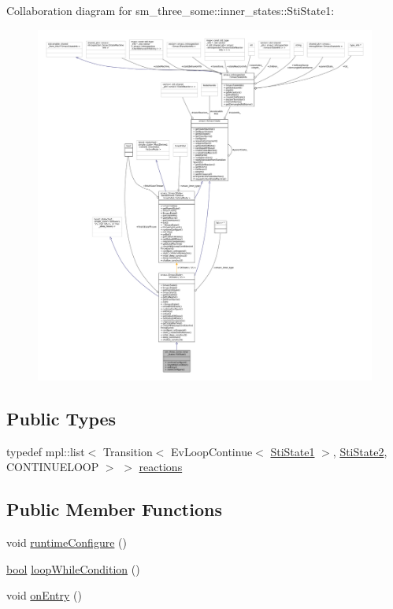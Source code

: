 Collaboration diagram for sm\+\_\+three\+\_\+some\+:\+:inner\+\_\+states\+:\+:Sti\+State1\+:
\nopagebreak
\begin{figure}[H]
\begin{center}
\leavevmode
\includegraphics[width=350pt]{structsm__three__some_1_1inner__states_1_1StiState1__coll__graph}
\end{center}
\end{figure}
\subsection*{Public Types}
\begin{DoxyCompactItemize}
\item 
typedef mpl\+::list$<$ Transition$<$ Ev\+Loop\+Continue$<$ \hyperlink{structsm__three__some_1_1inner__states_1_1StiState1}{Sti\+State1} $>$, \hyperlink{structsm__three__some_1_1inner__states_1_1StiState2}{Sti\+State2}, C\+O\+N\+T\+I\+N\+U\+E\+L\+O\+OP $>$ $>$ \hyperlink{structsm__three__some_1_1inner__states_1_1StiState1_a3880ea2992d3e5153deec7adafc52d8e}{reactions}
\end{DoxyCompactItemize}
\subsection*{Public Member Functions}
\begin{DoxyCompactItemize}
\item 
void \hyperlink{structsm__three__some_1_1inner__states_1_1StiState1_aa21f1eeac8b6c9685ad9a01aebc939aa}{runtime\+Configure} ()
\item 
\hyperlink{classbool}{bool} \hyperlink{structsm__three__some_1_1inner__states_1_1StiState1_aa57c154b9243b49328c11ba48c5d9779}{loop\+While\+Condition} ()
\item 
void \hyperlink{structsm__three__some_1_1inner__states_1_1StiState1_a678a34ba0258c496f873012299e65b98}{on\+Entry} ()
\end{DoxyCompactItemize}
